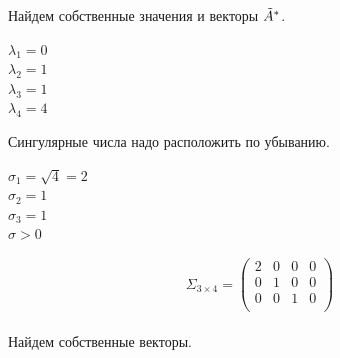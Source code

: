 \documentclass[12pt]{article}
\theoremstyle{definition}
\numberwithin{equation}{section}
\begin{document}
Найдем собственные значения и векторы $\tilde{A}^*\title{A}$.
\begin{center}
$\lambda_1=0$\\
$\lambda_2=1$\\
$\lambda_3=1$\\
$\lambda_4=4$\\
\end{center}
Сингулярные числа надо расположить по убыванию.
\begin{center}
$\sigma_1=\sqrt{4}=2$\\
$\sigma_2=1$\\
$\sigma_3=1$\\
$\sigma>0$\\
\end{center}
\[\Sigma_{3 \times 4} = \begin{pmatrix}
2 & 0 & 0 & 0\\         
0 & 1 & 0 & 0\\
0 & 0 & 1 & 0\\
\end{pmatrix}\]
\\
Найдем собственные векторы.
\end{document}
